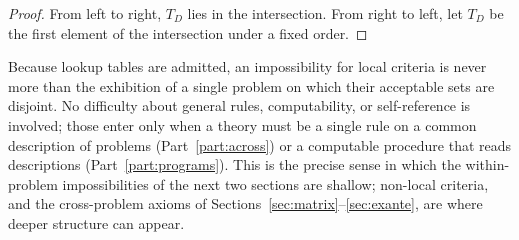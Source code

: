 \begin{proof}
From left to right, $T_D$ lies in the intersection. From right to left, let $T_D$ be the first
element of the intersection under a fixed order.
\end{proof}

Because lookup tables are admitted, an impossibility for local criteria is never more than the
exhibition of a single problem on which their acceptable sets are disjoint. No difficulty about
general rules, computability, or self-reference is involved; those enter only when a theory must be
a single rule on a common description of problems (Part~\ref{part:across}) or a computable procedure
that reads descriptions (Part~\ref{part:programs}). This is the precise sense in which the
within-problem impossibilities of the next two sections are shallow; non-local criteria, and the
cross-problem axioms of Sections~\ref{sec:matrix}--\ref{sec:exante}, are where deeper structure
can appear.
